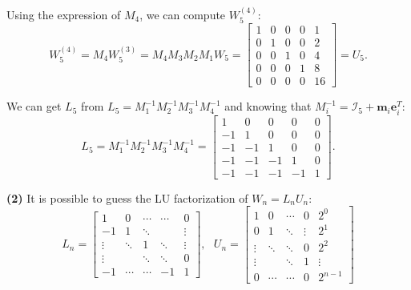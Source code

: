 \documentclass[a4paper]{report}
\numberwithin{equation}{chapter}
\begin{document}
\noindent Using the expression of $M_4$, we can compute $W_5^{(4)}$:
\begin{equation}\label{key}
	W_5^{(4)} = M_4 W_5^{(3)} = M_4 M_3 M_2 M_1 W_5 =
	\begin{bmatrix}
		1 & 0  & 0  & 0  & 1  \\
		0 & 1 & 0 & 0 & 2 \\
		0 & 0 & 1 & 0 & 4 \\
		0 & 0 & 0 & 1 & 8 \\
		0 & 0 & 0 & 0 & 16 
	\end{bmatrix} = U_5.
\end{equation}
	
\noindent We can get $L_5$ from $L_5 = M_1^{-1} M_2^{-1} M_3^{-1} M_4^{-1}$ and knowing that $M_i^{-1} = \mathcal{I}_5 + \textbf{m}_i \textbf{e}_i^T$:
\begin{equation}\label{key}
	L_5 = M_1^{-1} M_2^{-1} M_3^{-1} M_4^{-1} = 
	\begin{bmatrix}
		1 & 0  & 0  & 0  & 0  \\
		-1 & 1 & 0 & 0 & 0 \\
		-1 & -1 & 1 & 0 & 0 \\
		-1 & -1 & -1 & 1 & 0 \\
		-1 & -1 & -1 & -1 & 1 
	\end{bmatrix}.
\end{equation}
	
\noindent \textbf{(2)} It is possible to guess the LU factorization of $W_n = L_n U_n$:
\begin{equation}\label{key}
	L_n =
\begin{bmatrix}
	1 & 0  & \cdots  & \cdots  & 0 \\
	-1 & 1 & \ddots & \  & \vdots \\
	\vdots & \ddots & 1 & \ddots & \vdots \\
	\vdots & \  & \ddots & \ddots & 0 \\
	-1 & \cdots & \cdots & -1 & 1 
\end{bmatrix},\ \ \ 
U_n = 
\begin{bmatrix}
	1 & 0  & \cdots  & 0  & 2^0 \\
	0& 1 & \ddots & \vdots & 2^1 \\
	\vdots & \ddots & \ddots & 0 & 2^2 \\
	\vdots & \  & \ddots & 1 & \vdots \\
	0 & \cdots & \cdots & 0 & 2^{n-1}
\end{bmatrix}
\end{equation}
	
\end{document}
